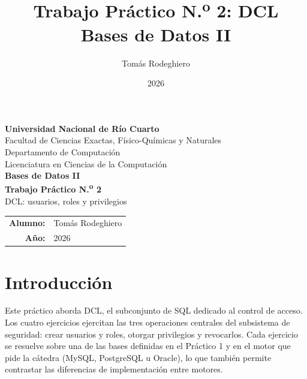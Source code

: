 \documentclass[11pt,a4paper]{article}
\title{Trabajo Práctico N.\textsuperscript{o} 2: DCL\\[4pt]
       \large Bases de Datos II}
\author{Tomás Rodeghiero}
\date{2026}
\begin{document}
\begin{titlepage}
    \centering
    \vspace*{1.5cm}

    {\large \textbf{Universidad Nacional de Río Cuarto}}\\[6pt]
    {\normalsize Facultad de Ciencias Exactas, Físico-Químicas y Naturales}\\[4pt]
    {\normalsize Departamento de Computación}\\[4pt]
    {\normalsize Licenciatura en Ciencias de la Computación}\\[3cm]

    {\Large \textbf{Bases de Datos II}}\\[1.2cm]

    {\Large \textbf{Trabajo Práctico N.\textsuperscript{o} 2}}\\[6pt]
    {\large DCL: usuarios, roles y privilegios}\\[3cm]

    \begin{tabular}{rl}
        \textbf{Alumno:} & Tomás Rodeghiero \\[4pt]
        \textbf{Año:}    & 2026 \\
    \end{tabular}

    \vfill
\end{titlepage}

\tableofcontents
\newpage

\section{Introducción}

Este práctico aborda DCL, el subconjunto de SQL dedicado al control de acceso. Los cuatro ejercicios ejercitan las tres operaciones centrales del subsistema de seguridad: crear usuarios y roles, otorgar privilegios y revocarlos. Cada ejercicio se resuelve sobre una de las bases definidas en el Práctico 1 y en el motor que pide la cátedra (MySQL, PostgreSQL u Oracle), lo que también permite contrastar las diferencias de implementación entre motores.
\end{document}
